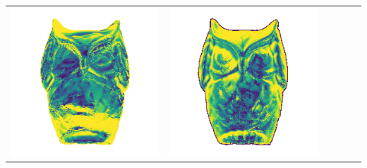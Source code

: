 \begin{center}
\begin{tabularx}{\linewidth}{@{}Y@{}Y@{}Y@{}Y@{}Y@{}Y@{}}
\includegraphics[width=\linewidth]{semisynthetic/20160617_15_yu_err.png} &
\includegraphics[width=\linewidth]{semisynthetic/20160617_15_dpsn_err.png} &

\end{tabularx}
\end{center}
